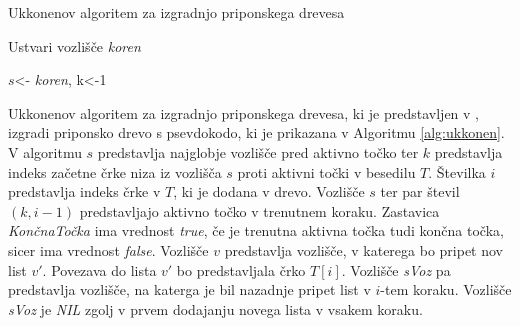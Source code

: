 \begin{algorithm}[htb]

    \caption{Ukkonenov algoritem za izgradnjo priponskega drevesa}\label{alg:ukkonen}
    {
        {Ustvari vozlišče \textit{koren}}
        
        {$s$<- \textit{koren}, k<-1}
        
        
    }
\end{algorithm}

Ukkonenov algoritem za izgradnjo priponskega drevesa, ki je predstavljen v \cite{Ukkonen1995}, izgradi priponsko drevo s psevdokodo, ki je prikazana v Algoritmu \ref{alg:ukkonen}.
V algoritmu $s$ predstavlja najglobje vozlišče pred aktivno točko ter $k$ predstavlja indeks začetne črke niza iz vozlišča $s$ proti aktivni točki v besedilu $T$. Številka $i$ predstavlja indeks črke v $T$, ki je dodana v drevo. Vozlišče $s$ ter par števil $(k,i-1)$ predstavljajo aktivno točko v trenutnem koraku. Zastavica \textit{KončnaTočka} ima vrednost \textit{true}, če je trenutna aktivna točka tudi končna točka, sicer ima vrednost \textit{false}. Vozlišče $v$ predstavlja vozlišče, v katerega bo pripet nov list $v'$. Povezava do lista $v'$ bo predstavljala črko $T[i]$. Vozlišče \textit{sVoz} pa predstavlja vozlišče, na katerga je bil nazadnje pripet list v $i$-tem koraku. Vozlišče \textit{sVoz} je \textit{NIL} zgolj v prvem dodajanju novega lista v vsakem koraku.


